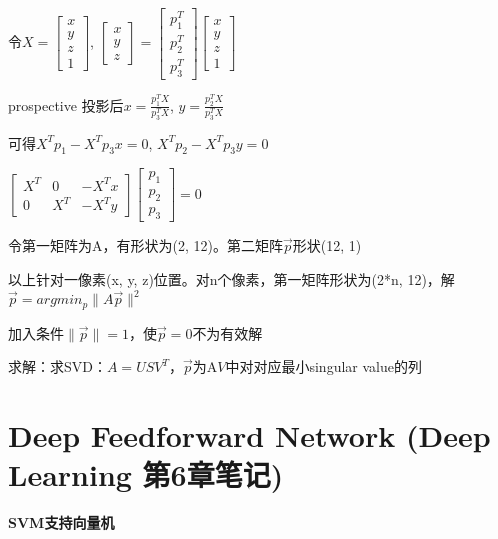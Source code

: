 \documentclass[UTF8]{ctexart}
\begin{document}
  令$X = 
    \begin{bmatrix}
      x \\
      y \\
      z \\
      1
      \end{bmatrix}$, $
    \begin{bmatrix}
      x \\
      y \\
      z
      \end{bmatrix} 
    =
    \begin{bmatrix}
      p_1^T \\
      p_2^T \\
      p_3^T
      \end{bmatrix}
    \begin{bmatrix}
      x \\
      y \\
      z \\
      1
      \end{bmatrix}$

  prospective 投影后$x = \frac{p_1^TX}{p_3^TX}$, $y = \frac{p_2^TX}{p_3^TX}$

  \quad 可得$X^Tp_1 - X^Tp_3x = 0$, $X^Tp_2 - X^Tp_3y = 0$

  \quad $
    \begin{bmatrix}
      X^T & 0 & -X^Tx \\
      0 & X^T & -X^Ty
      \end{bmatrix}
    \begin{bmatrix}
      p_1 \\
      p_2 \\
      p_3
      \end{bmatrix}
    = 0$

  \quad \quad 令第一矩阵为A，有形状为(2, 12)。第二矩阵$\vec{p}$形状(12, 1)

  \quad 以上针对一像素(x, y, z)位置。对n个像素，第一矩阵形状为(2*n, 12)，解$\vec{p} = argmin_p \|A\vec{p}\|^2$

  \quad \quad 加入条件$\|\vec{p}\| = 1$，使$\vec{p} = 0$不为有效解

  \quad \quad 求解：求SVD：$A = USV^T$，$\vec{p}$为A$V$中对对应最小singular value的列


\section{Deep Feedforward Network (Deep Learning 第6章笔记)}
\noindent \textbf{SVM支持向量机}
\end{document}
